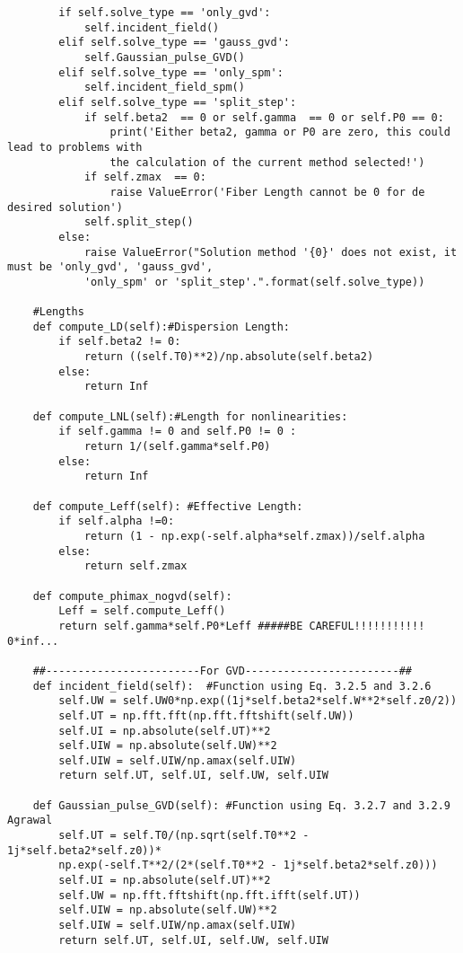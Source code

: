 \begin{verbatim}
        if self.solve_type == 'only_gvd':
            self.incident_field()
        elif self.solve_type == 'gauss_gvd':
            self.Gaussian_pulse_GVD()
        elif self.solve_type == 'only_spm':
            self.incident_field_spm()
        elif self.solve_type == 'split_step':
            if self.beta2  == 0 or self.gamma  == 0 or self.P0 == 0:
                print('Either beta2, gamma or P0 are zero, this could lead to problems with 
                the calculation of the current method selected!')
            if self.zmax  == 0:
                raise ValueError('Fiber Length cannot be 0 for de desired solution')       
            self.split_step()
        else:
            raise ValueError("Solution method '{0}' does not exist, it must be 'only_gvd', 'gauss_gvd',
            'only_spm' or 'split_step'.".format(self.solve_type))

    #Lengths
    def compute_LD(self):#Dispersion Length:
        if self.beta2 != 0:
            return ((self.T0)**2)/np.absolute(self.beta2)
        else:
            return Inf 

    def compute_LNL(self):#Length for nonlinearities:
        if self.gamma != 0 and self.P0 != 0 :
            return 1/(self.gamma*self.P0)
        else:
            return Inf 

    def compute_Leff(self): #Effective Length:
        if self.alpha !=0:
            return (1 - np.exp(-self.alpha*self.zmax))/self.alpha
        else: 
            return self.zmax 

    def compute_phimax_nogvd(self):
        Leff = self.compute_Leff()
        return self.gamma*self.P0*Leff #####BE CAREFUL!!!!!!!!!!! 0*inf...

    ##------------------------For GVD------------------------##
    def incident_field(self):  #Function using Eq. 3.2.5 and 3.2.6
        self.UW = self.UW0*np.exp((1j*self.beta2*self.W**2*self.z0/2))
        self.UT = np.fft.fft(np.fft.fftshift(self.UW))
        self.UI = np.absolute(self.UT)**2
        self.UIW = np.absolute(self.UW)**2
        self.UIW = self.UIW/np.amax(self.UIW) 
        return self.UT, self.UI, self.UW, self.UIW

    def Gaussian_pulse_GVD(self): #Function using Eq. 3.2.7 and 3.2.9 Agrawal
        self.UT = self.T0/(np.sqrt(self.T0**2 - 1j*self.beta2*self.z0))*
        np.exp(-self.T**2/(2*(self.T0**2 - 1j*self.beta2*self.z0)))
        self.UI = np.absolute(self.UT)**2
        self.UW = np.fft.fftshift(np.fft.ifft(self.UT))
        self.UIW = np.absolute(self.UW)**2
        self.UIW = self.UIW/np.amax(self.UIW) 
        return self.UT, self.UI, self.UW, self.UIW



\end{verbatim}
